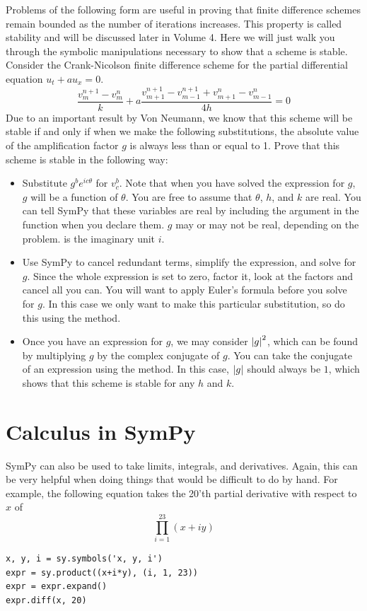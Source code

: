 \begin{problem}
Problems of the following form are useful in proving that finite difference schemes remain bounded as the number of iterations increases.
This property is called stability and will be discussed later in Volume 4.
Here we will just walk you through the symbolic manipulations necessary to show that a scheme is stable.
Consider the Crank-Nicolson finite difference scheme for the partial differential equation $u_t+a u_x=0$.
\begin{equation*}
\frac{v_{m}^{n+1}-v_{m}^{n}}{k}+a\frac{v_{m+1}^{n+1}-v_{m-1}^{n+1}+v_{m+1}^{n}-v_{m-1}^{n}}{4h}=0
\end{equation*}
Due to an important result by Von Neumann, we know that this scheme will be stable if and only if when we make the following substitutions, the absolute value of the amplification factor $g$ is always less than or equal to 1.
Prove that this scheme is stable in the following way:
\begin{itemize}
\item Substitute $g^b e^{i c \theta}$ for $v_c^b$.
Note that when you have solved the expression for $g$, $g$ will be a function of $\theta$.
You are free to assume that $\theta$, $h$, and $k$ are real.
You can tell SymPy that these variables are real by including the argument  in the  function when you declare them.
$g$ may or may not be real, depending on the problem.
 is the imaginary unit $i$.
\item Use SymPy to cancel redundant terms, simplify the expression, and solve for $g$.
Since the whole expression is set to zero, factor it, look at the factors and cancel all you can.
You will want to apply Euler's formula before you solve for $g$.
In this case we only want to make this particular substitution, so do this using the  method.
\item Once you have an expression for $g$, we may consider $\left\lvert g\right\rvert^2$, which can be found by multiplying $g$ by the complex conjugate of $g$. 
You can take the conjugate of an expression using the  method.
In this case, $\left\lvert g\right\rvert$ should always be $1$, which shows that this scheme is stable for any $h$ and $k$.
\end{itemize}
\end{problem}

\section*{Calculus in SymPy}
SymPy can also be used to take limits, integrals, and derivatives.
Again, this can be very helpful when doing things that would be difficult to do by hand.
For example, the following equation takes the 20'th partial derivative with respect to $x$ of 
\begin{equation*}
\prod_{i=1}^{23} \left(x+i y\right)
\end{equation*}
\begin{lstlisting}
x, y, i = sy.symbols('x, y, i')
expr = sy.product((x+i*y), (i, 1, 23))
expr = expr.expand()
expr.diff(x, 20)
\end{lstlisting}

